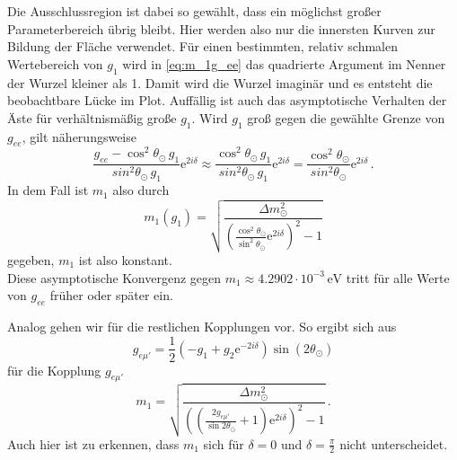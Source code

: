 Die Ausschlussregion ist dabei so gewählt, dass ein möglichst großer Parameterbereich übrig bleibt.
Hier werden also nur die innersten Kurven zur Bildung der Fläche verwendet.
Für einen bestimmten, relativ schmalen Wertebereich von $g_1$ wird in \eqref{eq:m_1g_ee} das quadrierte Argument im Nenner der Wurzel kleiner als 1.
Damit wird die Wurzel imaginär und es entsteht die beobachtbare Lücke im Plot.
Auffällig ist auch das asymptotische Verhalten der Äste für verhältnismäßig große $g_1$.
Wird $g_1$ groß gegen die gewählte Grenze von $g_{ee}$, gilt näherungsweise 
\begin{equation*}
    \frac{g_{ee} -  \cos^2 \theta_\odot \, g_1}{sin^2 \theta_\odot \, g_1} \mathrm{e}^{2 i \delta} \approx \frac{\cos^2 \theta_\odot \, g_1}{sin^2 \theta_\odot \, g_1} \mathrm{e}^{2 i \delta}
    = \frac{\cos^2 \theta_\odot}{sin^2 \theta_\odot} \mathrm{e}^{2 i \delta} \,.
\end{equation*}
In dem Fall ist $m_1$ also durch
\begin{equation*}
    m_1 (g_1) = \sqrt{\frac{\Delta m^2_\odot}{ \left(\frac{\cos^2 \theta_\odot}{\sin^2 \theta_\odot} \mathrm{e}^{2 i \delta}\right)^2 - 1}}
\end{equation*}
gegeben, $m_1$ ist also konstant. \\
Diese asymptotische Konvergenz gegen $m_1 \approx \num{4.2902} \cdot 10^{-3} \, \si{\eV}$ tritt für alle Werte von $g_{ee}$ früher oder später ein.

Analog gehen wir für die restlichen Kopplungen vor.
So ergibt sich aus
\begin{equation*}
    g_{e \mu'} = \frac{1}{2} \left(-g_1 + g_2 \mathrm{e}^{-2 i \delta}\right) \sin(2 \theta_\odot)
\end{equation*}
für die Kopplung $g_{e \mu'}$
\begin{equation}
    m_1 = \sqrt{\frac{\Delta m^2_\odot}{\left( \left(\frac{2 g_{e \mu'}}{\sin{2 \theta_\odot}} + 1 \right) \mathrm{e}^{2 i \delta}\right)^2 - 1}} \,.
    \label{eq:g_emu}
\end{equation}
Auch hier ist zu erkennen, dass $m_1$ sich für $\delta = 0$ und $\delta = \frac{\pi}{2}$ nicht unterscheidet.

